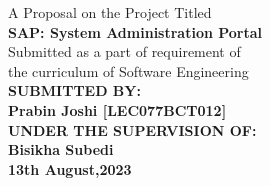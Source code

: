 \begin{center}
{\fontsize{12pt}{20}\selectfont A Proposal on the Project Titled}\\
\vspace{1in}
{\fontsize{14pt}{20}\selectfont \textbf{SAP: System Administration Portal}}\\
\vspace{1in}
Submitted as a part of requirement of \\the curriculum of
Software Engineering\\
\vspace{1in}
    {\fontsize{14pt}{20}\selectfont \textbf{\MakeUppercase{submitted by:}}}\\
    {\fontsize{14pt}{20}\selectfont \textbf{Prabin Joshi [LEC077BCT012]}}\\
\vspace{1in}
    {\fontsize{14pt}{20}\selectfont \textbf{\MakeUppercase{under the supervision of:}}}\\
    {\fontsize{14pt}{20}\selectfont \textbf{Bisikha Subedi}}\\
\vspace{1in}
{\fontsize{14pt}{20}\selectfont \textbf{13th August,2023}}\\
\end{center}
\newpage